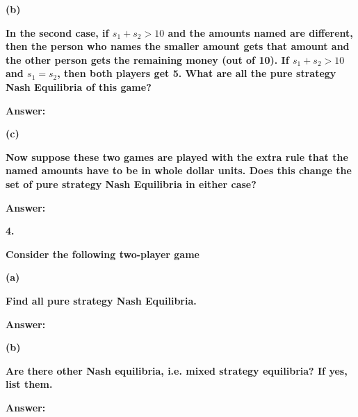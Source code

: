 \documentclass[letterpaper,11pt]{article}
\begin{document}
\begin{addmargin}[-1.1em]{0em}
\textbf{(b)}\par\end{addmargin}
\textbf{In the second case, if $s_1 + s_2 > 10$ and the amounts named are different, then the person who names the smaller amount gets that amount and the other person gets the remaining money (out of 10). If $s_1 + s_2 > 10$ and $s_1 = s_2$, then both players get 5. What are all the pure strategy Nash Equilibria of this game?
}\par

\bigbreak
\begin{addmargin}[-0.5em]{0em}
\textbf{Answer: }\end{addmargin}


\begin{addmargin}[-1.1em]{0em}
\textbf{(c)}\par\end{addmargin}

\textbf{Now suppose these two games are played with the extra rule that the named amounts have to be in whole dollar units. Does this change the set of pure strategy Nash Equilibria in either case?
}\par
\bigbreak
\begin{addmargin}[-0.5em]{0em}
\textbf{Answer: }\end{addmargin}





\begin{addmargin}[-2em]{0em} \large{\textbf{4. }}\end{addmargin}
\textbf{Consider the following two-player game}




\begin{addmargin}[-1.1em]{0em}
\textbf{(a)}\par\end{addmargin}
\textbf{Find all pure strategy Nash Equilibria.}
\bigbreak
\begin{addmargin}[-0.5em]{0em}
\textbf{Answer: }\end{addmargin}


\begin{addmargin}[-1.1em]{0em}
\textbf{(b)}\par\end{addmargin}
\textbf{Are there other Nash equilibria, i.e. mixed strategy equilibria? If yes, list them.
}\par
\bigbreak
\begin{addmargin}[-0.5em]{0em}
\textbf{Answer: }\end{addmargin}
\end{document}
